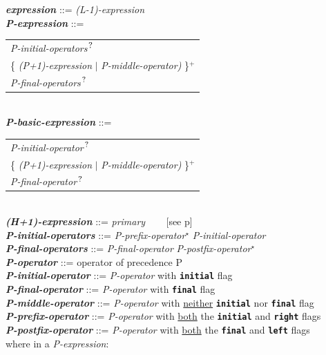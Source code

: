 \documentclass[12pt]{article}
\newcommand{\TT}[1]{{\tt \bfseries #1}}
\newcommand{\STAR}{{\Large $^\star$}}
\newcommand{\PLUS}[1][]{{$^{+#1}$}}
\newcommand{\QMARK}{{$^{\,\mbox{\footnotesize ?}}$}}
\newcommand{\emkey}[1]{{\em \bfseries #1}}
\newcommand{\pagref}[1]{p\pageref{#1}}
\newenvironment{indpar}[1][0.3in]%
	{\begin{list}{}%
		     {\setlength{\itemsep}{0in}%
		      \setlength{\topsep}{0in}%
		      \setlength{\parsep}{1ex}%
		      \setlength{\labelwidth}{#1}%
		      \setlength{\leftmargin}{#1}%
		      \addtolength{\leftmargin}{\labelsep}}%
	 \item}%
	{\end{list}}
\begin{document}
\begin{indpar}
\emkey{expression}\label{EXPRESSION} ::= {\em (L-1)-expression}
\\[0.5ex]
\emkey{P-expression} ::=
    \begin{tabular}[t]{@{}l}
    {\em P-initial-operators}\QMARK{} \\
    \{ {\em (P+1)-expression} $|$ {\em P-middle-operator)} \}\PLUS{} \\
    {\em P-final-operators}\QMARK{} \\
    \end{tabular}
\\[0.5ex]
\emkey{P-basic-expression} ::=
    \begin{tabular}[t]{@{}l}
    {\em P-initial-operator}\QMARK{} \\
    \{ {\em (P+1)-expression} $|$ {\em P-middle-operator)} \}\PLUS{} \\
    {\em P-final-operator}\QMARK{} \\
    \end{tabular}
\\[0.5ex]
\emkey{(H+1)-expression} ::= {\em primary} ~~~ [see \pagref{PRIMARY}]
\\[0.5ex]
\emkey{P-initial-operators} ::= {\em P-prefix-operator}\STAR{}
				{\em P-initial-operator}
\\[0.5ex]
\emkey{P-final-operators} ::= {\em P-final-operator}
				{\em P-postfix-operator}\STAR{}
\\[0.5ex]
\emkey{P-operator} ::= operator of precedence P
\\[0.5ex]
\emkey{P-initial-operator} ::= {\em P-operator} with \TT{initial} flag
\\[0.5ex]
\emkey{P-final-operator} ::= {\em P-operator} with \TT{final} flag
\\[0.5ex]
\emkey{P-middle-operator} ::= {\em P-operator} with \underline{neither}
                              \TT{initial} nor \TT{final} flag
\\[0.5ex]
\emkey{P-prefix-operator} ::= {\em P-operator} with \underline{both}
                              the \TT{initial} and \TT{right} flags
\\[0.5ex]
\emkey{P-postfix-operator} ::= {\em P-operator} with \underline{both}
                               the \TT{final} and \TT{left} flags
\\[2.0ex]
where in a {\em P-expression}: \\
\hspace*{1em}\begin{tabular}[t]{l}

\end{tabular}
\end{indpar}
\end{document}
